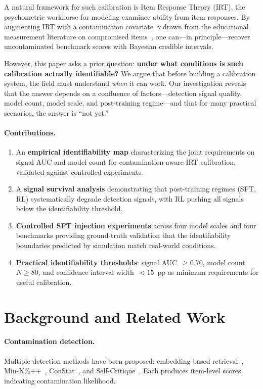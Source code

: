 \documentclass[letterpaper, 10pt, twocolumn]{article}
\begin{document}
A natural framework for such calibration is Item Response Theory (IRT), the psychometric workhorse for modeling examinee ability from item responses.
By augmenting IRT with a contamination covariate~$\gamma$ drawn from the educational measurement literature on compromised items~\citep{eckerly2017detecting,sinharay2017detection}, one can---in principle---recover uncontaminated benchmark scores with Bayesian credible intervals.

However, this paper asks a prior question: \textbf{under what conditions is such calibration actually identifiable?}
We argue that before building a calibration system, the field must understand \emph{when} it can work.
Our investigation reveals that the answer depends on a confluence of factors---detection signal quality, model count, model scale, and post-training regime---and that for many practical scenarios, the answer is ``not yet.''

\paragraph{Contributions.}
\begin{enumerate}
\item An \textbf{empirical identifiability map} characterizing the joint requirements on signal AUC and model count for contamination-aware IRT calibration, validated against controlled experiments.
\item A \textbf{signal survival analysis} demonstrating that post-training regimes (SFT, RL) systematically degrade detection signals, with RL pushing all signals below the identifiability threshold.
\item \textbf{Controlled SFT injection experiments} across four model scales and four benchmarks providing ground-truth validation that the identifiability boundaries predicted by simulation match real-world conditions.
\item \textbf{Practical identifiability thresholds}: signal AUC~$\geq 0.70$, model count~$N \geq 80$, and confidence interval width~$< 15$~pp as minimum requirements for useful calibration.
\end{enumerate}

\section{Background and Related Work}

\paragraph{Contamination detection.}
Multiple detection methods have been proposed: embedding-based retrieval~\citep{dodge2021documenting}, Min-K\%++~\citep{shi2024detecting}, ConStat~\citep{dekoninck2024constat}, and Self-Critique~\citep{weller2024selfcritique}.
Each produces item-level scores indicating contamination likelihood.
\end{document}
